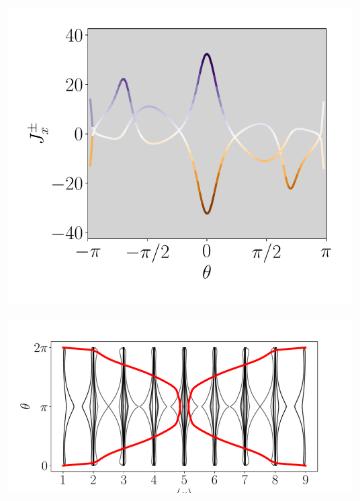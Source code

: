 \begin{figure}[h!]
     
     \begin{minipage}[h!]{1\textwidth}
         \begin{subfigure}[b!]{0.37 \textwidth}
             \caption{}
             \includegraphics[width=\textwidth]{Imagenes/Resultados_pump_Fractal/x/current_square_pump_pnx.pdf}
             \label{}
         \end{subfigure}\hspace{-0.5em}
         \begin{subfigure}[b!]{0.63 \textwidth}
             \caption{}
             \includegraphics[width=\textwidth]{Imagenes/Resultados_pump_Fractal/x/wannier_centerx.pdf}
             \label{}
         \end{subfigure}\hspace*{-0.5em}
     \end{minipage}\vspace*{-1em}
     
     
    \caption{}
    \label{fig:Pump_fractal_x}
\end{figure}